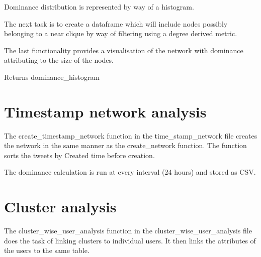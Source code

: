 \documentclass[]{article}
\begin{document}
Dominance distribution is represented by way of a histogram.

The next task is to create a dataframe which will include nodes possibly
belonging to a near clique by way of filtering using a degree derived
metric.

The last functionality provides a visualisation of the network with
dominance attributing to the size of the nodes.

Returns dominance\_histogram

\section{Timestamp network analysis}\label{timestamp-network-analysis}

The create\_timestamp\_network function in the time\_stamp\_network file
creates the network in the same manner as the create\_network function.
The function sorts the tweets by Created time before creation.

The dominance calculation is run at every interval (24 hours) and stored
as CSV.

\section{Cluster analysis}\label{cluster-analysis}

The cluster\_wise\_user\_analysis function in the
cluster\_wise\_user\_analysis file does the task of linking clusters to
individual users. It then links the attributes of the users to the same
table.
\end{document}
